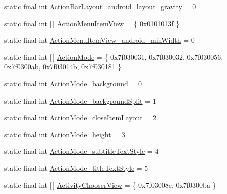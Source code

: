\begin{DoxyCompactItemize}
\item 
static final int \mbox{\hyperlink{classandroid_1_1support_1_1v7_1_1appcompat_1_1R_1_1styleable_a2e2986ce84f44ed522b12156ab4c80b5}{Action\+Bar\+Layout\+\_\+android\+\_\+layout\+\_\+gravity}} = 0
\item 
static final int \mbox{[}$\,$\mbox{]} \mbox{\hyperlink{classandroid_1_1support_1_1v7_1_1appcompat_1_1R_1_1styleable_a289a3ec3805aee2d895cf1061f6f50dd}{Action\+Menu\+Item\+View}} = \{ 0x0101013f \}
\item 
static final int \mbox{\hyperlink{classandroid_1_1support_1_1v7_1_1appcompat_1_1R_1_1styleable_ab1d71534a260d9546c5e69b7d0e88dc5}{Action\+Menu\+Item\+View\+\_\+android\+\_\+min\+Width}} = 0
\item 
static final int \mbox{[}$\,$\mbox{]} \mbox{\hyperlink{classandroid_1_1support_1_1v7_1_1appcompat_1_1R_1_1styleable_ac4197f1a9a85a8f5973cc5efa358ad9f}{Action\+Mode}} = \{ 0x7f030031, 0x7f030032, 0x7f030056, 0x7f0300ab, 0x7f03014b, 0x7f030181 \}
\item 
static final int \mbox{\hyperlink{classandroid_1_1support_1_1v7_1_1appcompat_1_1R_1_1styleable_ad7ba52748ba713c8092e94c3057ac025}{Action\+Mode\+\_\+background}} = 0
\item 
static final int \mbox{\hyperlink{classandroid_1_1support_1_1v7_1_1appcompat_1_1R_1_1styleable_ac607392c03577a89e93114489fed7bde}{Action\+Mode\+\_\+background\+Split}} = 1
\item 
static final int \mbox{\hyperlink{classandroid_1_1support_1_1v7_1_1appcompat_1_1R_1_1styleable_a88da42ef1d36118bca40662482cd497d}{Action\+Mode\+\_\+close\+Item\+Layout}} = 2
\item 
static final int \mbox{\hyperlink{classandroid_1_1support_1_1v7_1_1appcompat_1_1R_1_1styleable_a2e5464164ea951a44ac4815251293494}{Action\+Mode\+\_\+height}} = 3
\item 
static final int \mbox{\hyperlink{classandroid_1_1support_1_1v7_1_1appcompat_1_1R_1_1styleable_ac381486db10fa194bd8cbacee9e63d5d}{Action\+Mode\+\_\+subtitle\+Text\+Style}} = 4
\item 
static final int \mbox{\hyperlink{classandroid_1_1support_1_1v7_1_1appcompat_1_1R_1_1styleable_a7035ee3ffdabf8eda2e2b3f427835911}{Action\+Mode\+\_\+title\+Text\+Style}} = 5
\item 
static final int \mbox{[}$\,$\mbox{]} \mbox{\hyperlink{classandroid_1_1support_1_1v7_1_1appcompat_1_1R_1_1styleable_a982c115fab0715899d54b7816a21cc47}{Activity\+Chooser\+View}} = \{ 0x7f03008e, 0x7f0300ba \}
\item 

\end{DoxyCompactItemize}
